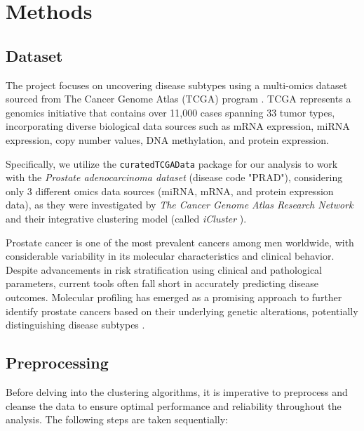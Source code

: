 
\section{Methods}\label{sec:methods}

\subsection{Dataset}

The project focuses on uncovering disease subtypes using a multi-omics dataset sourced from The Cancer Genome Atlas (TCGA) program \cite{hutter2018TCGA}. TCGA represents a genomics initiative that contains over 11,000 cases spanning 33 tumor types, incorporating diverse biological data sources such as mRNA expression, miRNA expression, copy number values, DNA methylation, and protein expression.

Specifically, we utilize the \verb|curatedTCGAData| \cite{ramos2020curatedTCGAData} package for our analysis to work with the \textit{Prostate adenocarcinoma dataset} (disease code "PRAD"), considering only 3 different omics data sources (miRNA, mRNA, and protein expression data), as they were investigated by \textit{The Cancer Genome Atlas Research Network} \cite{abeshouse2015molecularPRAD} and their integrative clustering model (called \textit{iCluster} \cite{shen2009integrative}).

Prostate cancer is one of the most prevalent cancers among men worldwide, with considerable variability in its molecular characteristics and clinical behavior. Despite advancements in risk stratification using clinical and pathological parameters, current tools often fall short in accurately predicting disease outcomes. Molecular profiling has emerged as a promising approach to further identify prostate cancers based on their underlying genetic alterations, potentially distinguishing disease subtypes \cite{abeshouse2015molecularPRAD}.

\subsection{Preprocessing}

Before delving into the clustering algorithms, it is imperative to preprocess and cleanse the data to ensure optimal performance and reliability throughout the analysis. The following steps are taken sequentially:

